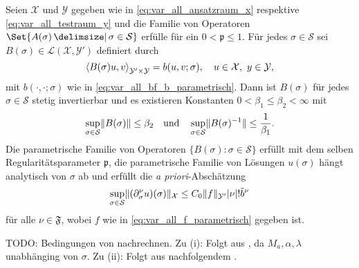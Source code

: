 \begin{Satz}
    \label{thm:kunoth:theorem21}
    Seien $\mathcal X$ und $\mathcal Y$ gegeben wie in \eqref{eq:var_all_ansatzraum_x} respektive \eqref{eq:var_all_testraum_y} und die Familie von Operatoren $\Set{ A(\sigma) \given \sigma \in \mathcal S }$ erfülle  für ein $0 < \mathfrak p \leq 1$.
    Für jedes $\sigma \in \mathcal S$ sei $B(\sigma) \in \mathcal L(\mathcal X, \mathcal Y')$ definiert durch
    \begin{equation}
        \label{eq:var_all_gross_b_parametrisch}
        \left\langle B(\sigma) u,v\right\rangle_{\mathcal Y' \times \mathcal Y} = b(u, v; \sigma), \quad u \in \mathcal X,~y \in \mathcal Y,
    \end{equation}
    mit $b(\cdot, \cdot; \sigma)$ wie in \eqref{eq:var_all_bf_b_parametrisch}.
    Dann ist $B(\sigma)$ für jedes $\sigma \in \mathcal S$ stetig invertierbar und es existieren Konstanten $0 < \beta_{1} \leq \beta_{2} < \infty$ mit
    \begin{equation}
        \label{eq:var_all_norm_B_und_B_inv_parametrisch}
        \sup_{\sigma \in \mathcal S} \lVert B(\sigma)\rVert \leq \beta_{2} \quad \text{und} \quad  \sup_{\sigma \in \mathcal S} \lVert B(\sigma)^{-1}\rVert \leq \frac{1}{\beta_{1}}.
    \end{equation}
    Die parametrische Familie von Operatoren $\{ B(\sigma) : \sigma \in \mathcal S \}$ erfüllt  mit dem selben Regularitätsparameter $\mathfrak p$, die parametrische Familie von Lösungen $u(\sigma)$ hängt analytisch von $\sigma$ ab und erfüllt die \emph{a priori}-Abschätzung
    \begin{equation}
        \label{eq:var_all_a_priori_schranke}
        \sup_{\sigma \in \mathcal S} \lVert(\partial^{\nu}_{\sigma} u)(\sigma)\rVert_{\mathcal X} \leq C_{0} \lVert f\rVert_{\mathcal Y'} \lvert\nu\rvert! \tilde{b}^{\nu}
    \end{equation}
    für alle $\nu \in \mathfrak F$, wobei $f$ wie in \eqref{eq:var_all_f_parametrisch} gegeben ist.

    \begin{Beweis}
        TODO: Bedingungen von  nachrechnen.
        Zu (i): Folgt aus , da $M_{a}, \alpha, \lambda$ unabhänging von $\sigma$.
        Zu (ii): Folgt aus nachfolgendem .
    \end{Beweis}
\end{Satz}

